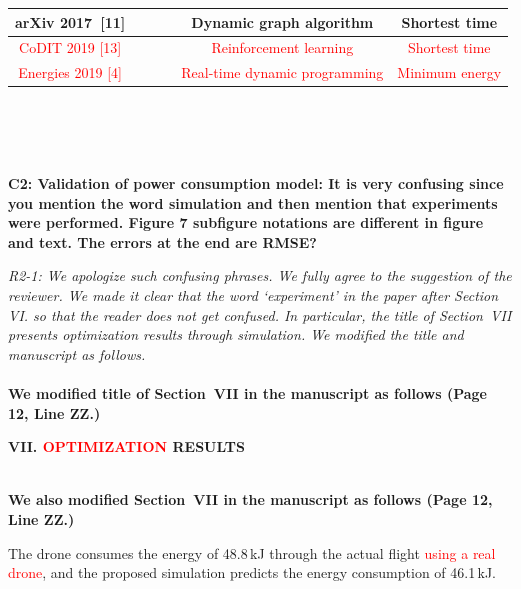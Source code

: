 \documentclass[onecolumn]{IEEEconf}
\newcommand{\cmark}{\ding{51}}%
\newcommand{\xmark}{\ding{55}}%
\begin{document}
\begin{description}
\begin{mdframed}
\begin{tabular}{|c|c|c|c|c|c|}
    \small arXiv 2017~[11] & \cmark & \cmark & %
    & \small Dynamic graph algorithm & \small Shortest time \\ \hline
    \textcolor{red}{\small CoDIT 2019 {[13]}} &  &  & %
    & \textcolor{red}{\small Reinforcement learning} & \textcolor{red}{\small Shortest time} \\ \hline
    \textcolor{red}{\small Energies 2019 {[4]}} & \textcolor{red}{\cmark} & \textcolor{red}{\cmark} 
    & \textcolor{red}{\cmark} & \textcolor{red}{\small Real-time dynamic programming} & \textcolor{red}{\small Minimum energy} \\ \hline
    \end{tabular}
    \end{mdframed}
    ~\\	
    ~\\
    ~\\
    \item \textbf
    {
	C2: Validation of power consumption model:
It is very confusing since you mention the word simulation and then mention that experiments were performed.
Figure 7 subfigure notations are different in figure and text.
The errors at the end are RMSE?
	}
	\item \textit
	{
	R2-1: We apologize such confusing phrases. We fully agree to the suggestion of the reviewer. We made it clear that the word `experiment' in the paper after Section VI. so that the reader does not get confused. In particular, the title of Section~VII presents optimization results through simulation. We modified the title and manuscript as follows.
	}
	~\\
	~\\
        \textbf{We modified title of Section~VII in the manuscript as follows (Page 12, Line ZZ.)}\\
        \begin{mdframed}[ linewidth=.75pt, userdefinedwidth=0.9\textwidth]
        \textbf{VII. \textcolor{red}{OPTIMIZATION} RESULTS}
        \end{mdframed}
	~\\
        \textbf{We also modified Section~VII in the manuscript as follows (Page 12, Line ZZ.)}\\
        \begin{mdframed}[ linewidth=.75pt, userdefinedwidth=0.9\textwidth]
    The drone consumes the energy of 48.8\,kJ through the actual flight \textcolor{red}{using a real drone}, and the proposed simulation predicts the energy consumption of 46.1\,kJ.

\end{mdframed}
\end{description}
\end{document}
